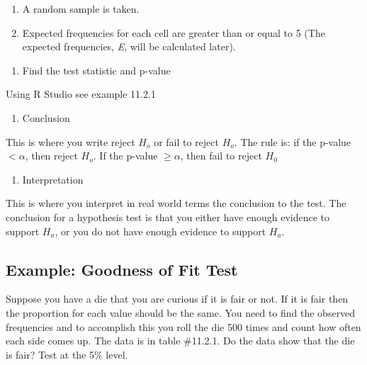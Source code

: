 \documentclass[]{book}
\providecommand{\tightlist}{%
  \setlength{\itemsep}{0pt}\setlength{\parskip}{0pt}}
\begin{document}
\begin{enumerate}
\def\labelenumi{\alph{enumi}.}
\item
  A random sample is taken.
\item
  Expected frequencies for each cell are greater than or equal to 5 (The expected frequencies, \emph{E}, will be calculated later).
\end{enumerate}

\begin{enumerate}
\def\labelenumi{\arabic{enumi}.}
\setcounter{enumi}{2}
\tightlist
\item
  Find the test statistic and p-value
\end{enumerate}

Using R Studio see example 11.2.1

\begin{enumerate}
\def\labelenumi{\arabic{enumi}.}
\setcounter{enumi}{3}
\tightlist
\item
  Conclusion
\end{enumerate}

This is where you write reject \(H_o\) or fail to reject \(H_o\). The rule is: if the p-value \(<\alpha\), then reject \(H_o\). If the p-value \(\ge \alpha\), then fail to reject \(H_0\)

\begin{enumerate}
\def\labelenumi{\arabic{enumi}.}
\setcounter{enumi}{4}
\tightlist
\item
  Interpretation
\end{enumerate}

This is where you interpret in real world terms the conclusion to the test. The conclusion for a hypothesis test is that you either have enough evidence to support \(H_a\), or you do not have enough evidence to support \(H_a\).

\hypertarget{example-goodness-of-fit-test}{%
\subsection{Example: Goodness of Fit Test}\label{example-goodness-of-fit-test}}

Suppose you have a die that you are curious if it is fair or not. If it is fair then the proportion for each value should be the same. You need to find the observed frequencies and to accomplish this you roll the die 500 times and count how often each side comes up. The data is in table \#11.2.1. Do the data show that the die is fair? Test at the 5\% level.
\end{document}
